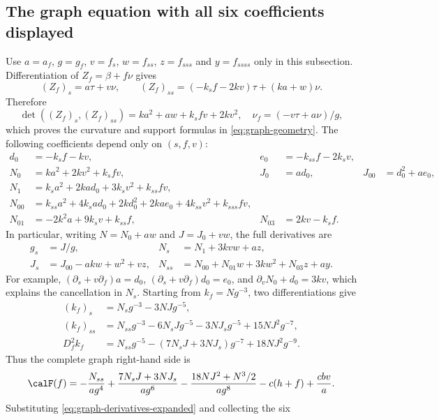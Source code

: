 \subsection{The graph equation with all six coefficients displayed}
Use $a=a_f$, $g=g_f$, $v=f_s$, $w=f_{ss}$, $z=f_{sss}$ and $y=f_{ssss}$
only in this subsection. Differentiation of $Z_f=\beta+f\nu$ gives
\[
 (Z_f)_s=a\tau+v\nu,\qquad
 (Z_f)_{ss}=(-k_sf-2kv)\tau+(ka+w)\nu.
\]
Therefore
\[
 \det((Z_f)_s,(Z_f)_{ss})=ka^2+aw+k_sfv+2kv^2,
 \quad \nu_f=(-v\tau+a\nu)/g,
\]
which proves the curvature and support formulas in \eqref{eq:graph-geometry}.
The following coefficients depend only on $(s,f,v)$:
\begin{align}
 d_0&=-k_sf-kv,& e_0&=-k_{ss}f-2k_sv,\nonumber\\
 N_0&=ka^2+2kv^2+k_sfv,&J_0&=ad_0,&J_{00}&=d_0^2+ae_0,\nonumber\\
 N_1&=k_sa^2+2kad_0+3k_sv^2+k_{ss}fv,\nonumber\\
 N_{00}&=k_{ss}a^2+4k_sad_0+2kd_0^2+2kae_0
                    +4k_{ss}v^2+k_{sss}fv,\nonumber\\
 N_{01}&=-2k^2a+9k_sv+k_{ss}f,&N_{03}&=2kv-k_sf.
 \label{eq:graph-aux-expanded}
\end{align}
In particular, writing $N=N_0+aw$ and $J=J_0+vw$, the full derivatives are
\begin{equation}\label{eq:graph-derivatives-expanded}
\begin{aligned}
 g_s&=J/g,&N_s&=N_1+3kvw+az,\\
 J_s&=J_{00}-akw+w^2+vz,&
 N_{ss}&=N_{00}+N_{01}w+3kw^2+N_{03}z+ay.
\end{aligned}
\end{equation}
For example, $(\partial_s+v\partial_f)a=d_0$,
$(\partial_s+v\partial_f)d_0=e_0$, and
$\partial_vN_0+d_0=3kv$, which explains the cancellation in $N_s$.
Starting from $k_f=Ng^{-3}$, two differentiations give
\begin{align*}
 (k_f)_s&=N_sg^{-3}-3NJg^{-5},\\
 (k_f)_{ss}&=N_{ss}g^{-3}-6N_sJg^{-5}-3NJ_sg^{-5}+15NJ^2g^{-7},\\
 D_f^2k_f&=N_{ss}g^{-5}-(7N_sJ+3NJ_s)g^{-7}+18NJ^2g^{-9}.
\end{align*}
Thus the complete graph right-hand side is
\begin{equation}\label{eq:graph-full-expanded}
 \calF(f)=-\frac{N_{ss}}{ag^4}
 +\frac{7N_sJ+3NJ_s}{ag^6}
 -\frac{18NJ^2+N^3/2}{ag^8}-c(h+f)+\frac{cbv}{a}.
\end{equation}
Substituting \eqref{eq:graph-derivatives-expanded} and collecting the six
